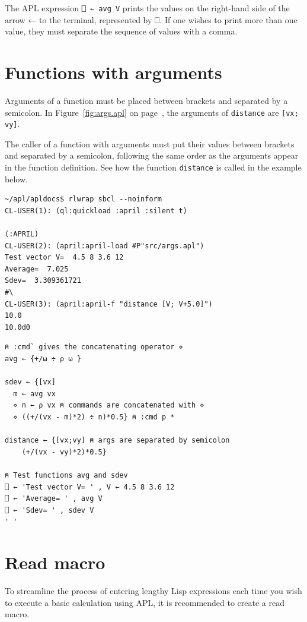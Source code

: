 \documentclass[a4paper,12pt]{book}
\begin{document}
The APL expression \verb|⎕ ← avg V| prints the values on
the right-hand side of the arrow ← to the terminal,
represented by ⎕. If one wishes to print more than
one value, they must separate the sequence of values
with a comma.

\section{Functions with arguments}
Arguments of a function must
be placed between brackets and separated
by a semicolon. In Figure~\ref{fig:args.apl} on
page~\pageref{fig:args.apl}, the arguments
of \verb|distance| are \verb|[vx; vy]|.

The caller of a function with arguments must
put their values between brackets and separated
by a semicolon, following the same order as the
arguments appear in the function definition.
See how the function \verb|distance| is called
in the example below.
\begin{verbatim}
~/apl/apldocs$ rlwrap sbcl --noinform
CL-USER(1): (ql:quickload :april :silent t)

(:APRIL)
CL-USER(2): (april:april-load #P"src/args.apl")
Test vector V=  4.5 8 3.6 12
Average=  7.025
Sdev=  3.309361721
#\ 
CL-USER(3): (april:april-f "distance [V; V+5.0]")
10.0
10.0d0
\end{verbatim}




\begin{lstlisting}[language=apl, float=tp,
      basicstyle=\large,
      caption={File src/args.apl -- Function with args},
      label={fig:args.apl}]
⍝ :cmd` gives the concatenating operator ⋄
avg ← {+/⍵ ÷ ⍴ ⍵ }

sdev ← {[vx]
  m ← avg vx
  ⋄ n ← ⍴ vx ⍝ commands are concatenated with ⋄
  ⋄ ((+/(vx - m)*2) ÷ n)*0.5} ⍝ :cmd p *

distance ← {[vx;vy] ⍝ args are separated by semicolon
    (+/(vx - vy)*2)*0.5}

⍝ Test functions avg and sdev
⎕ ← 'Test vector V= ' , V ← 4.5 8 3.6 12
⎕ ← 'Average= ' , avg V
⎕ ← 'Sdev= ' , sdev V
' '
\end{lstlisting}

\section{Read macro}
To streamline the process of entering lengthy
Lisp expressions each time you wish to execute
a basic calculation using APL, it is recommended
to create a read macro.
\end{document}
